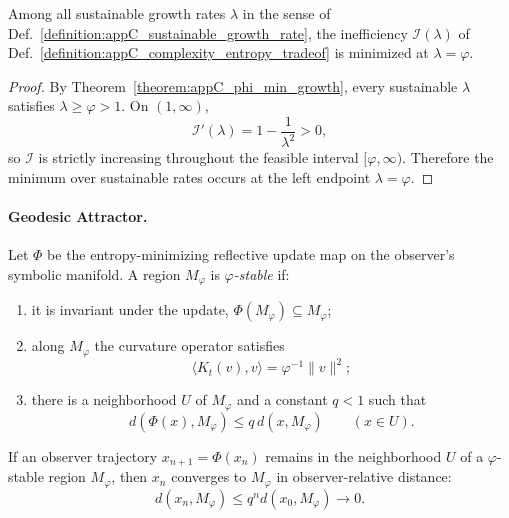 \begin{theorem}
\label{theorem:appC_phi_minimized_entropy_per_complexity}
Among all sustainable growth rates $\lambda$ in the sense of
Def.~\ref{definition:appC_sustainable_growth_rate}, the inefficiency
$\mathcal{I}(\lambda)$ of Def.~\ref{definition:appC_complexity_entropy_tradeof} is
minimized at $\lambda=\varphi$.
\end{theorem}

\begin{proof}
\label{proof:appC_phi_minimized_entropy_per_complexity}
By Theorem~\ref{theorem:appC_phi_min_growth}, every sustainable $\lambda$ satisfies
$\lambda\ge\varphi>1$. On $(1,\infty)$,
\[
\mathcal{I}'(\lambda)=1-\frac{1}{\lambda^2}>0,
\]
so $\mathcal{I}$ is strictly increasing throughout the feasible interval
$[\varphi,\infty)$. Therefore the minimum over sustainable rates occurs at the
left endpoint $\lambda=\varphi$.
\end{proof}

\paragraph{Geodesic Attractor.}
\label{paragraph:geometric_attractor_and_phi_spiral}

\begin{definition}
\label{definition:appC_phi_stable_region}
Let $\Phi$ be the entropy-minimizing reflective update map on the observer's
symbolic manifold. A region $M_\varphi$ is \emph{$\varphi$-stable} if:
\begin{enumerate}
    \item it is invariant under the update, $\Phi(M_\varphi)\subseteq M_\varphi$;
    \item along $M_\varphi$ the curvature operator satisfies
    \[
    \langle K_t(v), v \rangle = \varphi^{-1} \|v\|^2;
    \]
    \item there is a neighborhood $U$ of $M_\varphi$ and a constant $q<1$ such that
    \[
    d(\Phi(x),M_\varphi)\le q\,d(x,M_\varphi)\qquad(x\in U).
    \]
\end{enumerate}
\end{definition}

\begin{lemma}
\label{lemma:appC_geodesic_convergence}
If an observer trajectory $x_{n+1}=\Phi(x_n)$ remains in the neighborhood $U$ of a
$\varphi$-stable region $M_\varphi$, then $x_n$ converges to $M_\varphi$ in
observer-relative distance:
\[
 d(x_n,M_\varphi)\le q^n d(x_0,M_\varphi)\longrightarrow0 .
\]
\end{lemma}


